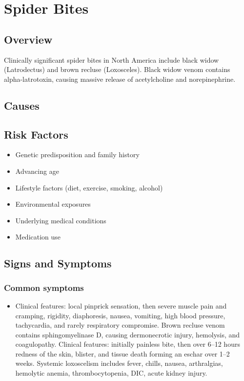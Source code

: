 \chapter{Spider Bites}
\label{sec:Spider Bites}

\section{Overview}
Clinically significant spider bites in North America include black widow (Latrodectus) and brown recluse (Loxosceles). Black widow venom contains alpha-latrotoxin, causing massive release of acetylcholine and norepinephrine.
\section{Causes}
\section{Risk Factors}

\begin{itemize}[noitemsep]
  \item Genetic predisposition and family history
  \item Advancing age
  \item Lifestyle factors (diet, exercise, smoking, alcohol)
  \item Environmental exposures
  \item Underlying medical conditions
  \item Medication use
\end{itemize}
\section{Signs and Symptoms}

\subsection{Common symptoms}
\begin{itemize}[noitemsep]
  \item Clinical features: local pinprick sensation, then severe muscle pain and cramping, rigidity, diaphoresis, nausea, vomiting, high blood pressure, tachycardia, and rarely respiratory compromise. Brown recluse venom contains sphingomyelinase D, causing dermonecrotic injury, hemolysis, and coagulopathy. Clinical features: initially painless bite, then over 6--12 hours redness of the skin, blister, and tissue death forming an eschar over 1--2 weeks. Systemic loxoscelism includes fever, chills, nausea, arthralgias, hemolytic anemia, thrombocytopenia, DIC, acute kidney injury. 
  \end{itemize}

